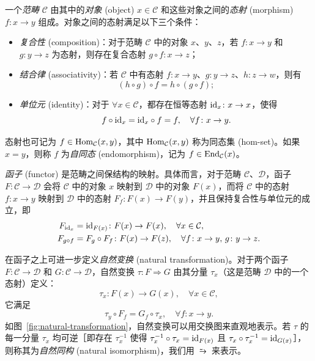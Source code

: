 一个\emph{范畴} $\mathcal{C}$ 由其中的\emph{对象} (object) $x\in\mathcal{C}$ 和这些对象之间的\emph{态射} (morphism) $f\colon x\to y$ 组成。对象之间的态射满足以下三个条件：
\begin{itemize}
  \item \emph{复合性} (composition)：对于范畴 $\mathcal{C}$ 中的对象 $x$、$y$、$z$，若 $f\colon x\to y$ 和 $g\colon y\to z$ 为态射，则存在复合态射 $g\circ f\colon x\to z$；
  \item \emph{结合律} (associativity)：若 $\mathcal{C}$ 中有态射 $f\colon x\to y$、$g\colon y\to z$、$h\colon z\to w$，则有
    \begin{equation}
      (h\circ g)\circ f = h\circ (g\circ f);
    \end{equation}
  \item \emph{单位元} (identity)：对于 $\forall x\in\mathcal{C}$，都存在恒等态射 $\mathrm{id}_x\colon x\to x$，使得
    \begin{equation}
      f \circ \mathrm{id}_x = \mathrm{id}_x \circ f = f, \quad \forall f\colon x\to y.
    \end{equation}
\end{itemize}
态射也可记为 $f\in\operatorname{Hom}_{\mathcal{C}}(x,y)$，其中 $\operatorname{Hom}_{\mathcal{C}}(x,y)$ 称为同态集 (hom-set)。如果 $x=y$，则称 $f$ 为\emph{自同态} (endomorphism)，记为 $f\in\operatorname{End}_{\mathcal{C}}(x)$。

\emph{函子} (functor) 是范畴之间保结构的映射。具体而言，对于范畴 $\mathcal{C}$、$\mathcal{D}$，函子 $F\colon\mathcal{C}\to\mathcal{D}$ 会将 $\mathcal{C}$ 中的对象 $x$ 映射到 $\mathcal{D}$ 中的对象 $F(x)$，而将 $\mathcal{C}$ 中的态射 $f\colon x\to y$ 映射到 $\mathcal{D}$ 中的态射 $F_f\colon F(x)\to F(y)$，并且保持复合性与单位元的成立，即
\begin{align}
  F_{\mathrm{id}_x} &= \mathrm{id}_{F(x)} \colon F(x) \to F(x), \quad \forall x\in\mathcal{C}, \\
  F_{g\circ f} &= F_g \circ F_f \colon F(x) \to F(z), \quad \forall f\colon x\to y, \, g\colon y\to z.
\end{align}

在函子之上可进一步定义\emph{自然变换} (natural transformation)。对于两个函子 $F\colon\mathcal{C}\to\mathcal{D}$ 和 $G\colon\mathcal{C}\to\mathcal{D}$，自然变换 $\tau\colon F\Rightarrow G$ 由其分量 $\tau_x$（这是范畴 $\mathcal{D}$ 中的一个态射）定义：
\begin{equation}
  \tau_x\colon F(x)\to G(x), \quad \forall x\in\mathcal{C},
\end{equation}
它满足
\begin{equation}
  \tau_y \circ F_f = G_f \circ \tau_x, \quad \forall f\colon x\to y.
\end{equation}
如图~\ref{fig:natural-transformation}，自然变换可以用交换图来直观地表示。若 $\tau$ 的每一分量 $\tau_x$ 均可逆［即存在 $\tau_x^{-1}$ 使得 $\tau^{-1}_x\circ\tau_x=\mathrm{id}_{F(x)}$ 且 $\tau_x\circ\tau^{-1}_x = \mathrm{id}_{G(x)}$］，则称其为\emph{自然同构} (natural isomorphism)，我们用 $\similarrightarrow$ 来表示。


